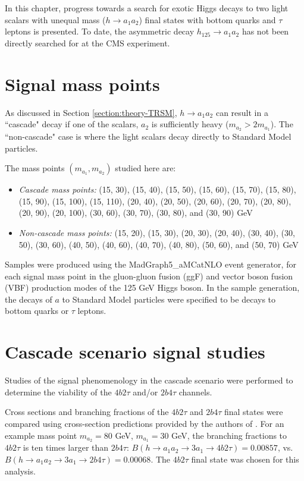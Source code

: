 In this chapter, progress towards a search for exotic Higgs decays to two light scalars with unequal mass ($h \rightarrow a_1 a_2$) final states with bottom quarks and $\tau$ leptons is presented. To date, the asymmetric decay $h_{125} \rightarrow a_1 a_2$ has not been directly searched for at the CMS experiment.

\section{Signal mass points}
As discussed in Section \ref{section:theory-TRSM}, $h \rightarrow a_1 a_2$ can result in a ``cascade" decay if one of the scalars, $a_2$ is sufficiently heavy ($m_{a_2} > 2m_{a_1}$). The ``non-cascade" case is where the light scalars decay directly to Standard Model particles. 

The mass points $(m_{a_1}, m_{a_2})$ studied here are:
\begin{itemize}
    \item \textit{Cascade mass points:} (15, 30), (15, 40), (15, 50), (15, 60), (15, 70), (15, 80), (15, 90), (15, 100), (15, 110), (20, 40), (20, 50), (20, 60), (20, 70), (20, 80), (20, 90), (20, 100), (30, 60), (30, 70), (30, 80), and (30, 90) GeV
    \item \textit{Non-cascade mass points:} (15, 20), (15, 30), (20, 30), (20, 40), (30, 40), (30, 50), (30, 60), (40, 50), (40, 60), (40, 70), (40, 80), (50, 60), and (50, 70) GeV
\end{itemize}
Samples were produced using the MadGraph5\_aMCatNLO event generator, for each signal mass point in the gluon-gluon fusion (ggF) and vector boson fusion (VBF) production modes of the 125 GeV Higgs boson. In the sample generation, the decays of $a$ to Standard Model particles were specified to be decays to bottom quarks or $\tau$ leptons.


\section{Cascade scenario signal studies}
Studies of the signal phenomenology in the cascade scenario were performed to determine the viability of the $4b2\tau$ and/or $2b4\tau$ channels. 

Cross sections and branching fractions of the $4b2\tau$ and $2b4\tau$ final states were compared using cross-section predictions provided by the authors of \cite{Robens:2019kga}. For an example mass point $m_{a_2} = 80$ GeV, $m_{a_1} = 30$ GeV, the branching fractions to $4b2\tau$ is ten times larger than $2b4\tau$: $B(h \rightarrow a_1 a_2 \rightarrow 3 a_1 \rightarrow 4b2\tau) = 0.00857$, vs. $B(h \rightarrow a_1 a_2 \rightarrow 3 a_1 \rightarrow 2b4\tau) = 0.00068$. The $4b2\tau$ final state was chosen for this analysis.

